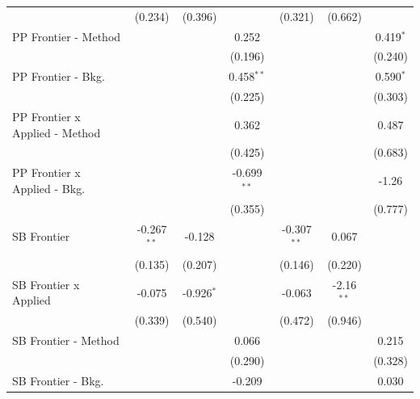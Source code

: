 \begin{tabular}{lcccccc}
                                  & (0.234)       & (0.396)      &               & (0.321)       & (0.662)      &   \\   
   PP Frontier - Method           &               &              & 0.252         &               &              & 0.419$^{*}$\\   
                                  &               &              & (0.196)       &               &              & (0.240)\\   
   PP Frontier - Bkg.             &               &              & 0.458$^{**}$  &               &              & 0.590$^{*}$\\   
                                  &               &              & (0.225)       &               &              & (0.303)\\   
   PP Frontier x Applied - Method &               &              & 0.362         &               &              & 0.487\\   
                                  &               &              & (0.425)       &               &              & (0.683)\\   
   PP Frontier x Applied - Bkg.   &               &              & -0.699$^{**}$ &               &              & -1.26\\   
                                  &               &              & (0.355)       &               &              & (0.777)\\   
   SB Frontier                    & -0.267$^{**}$ & -0.128       &               & -0.307$^{**}$ & 0.067        &   \\   
                                  & (0.135)       & (0.207)      &               & (0.146)       & (0.220)      &   \\   
   SB Frontier x Applied          & -0.075        & -0.926$^{*}$ &               & -0.063        & -2.16$^{**}$ &   \\   
                                  & (0.339)       & (0.540)      &               & (0.472)       & (0.946)      &   \\   
   SB Frontier - Method           &               &              & 0.066         &               &              & 0.215\\   
                                  &               &              & (0.290)       &               &              & (0.328)\\   
   SB Frontier - Bkg.             &               &              & -0.209        &               &              & 0.030\\   

\end{tabular}
